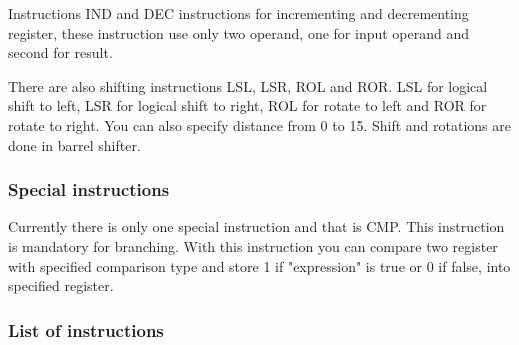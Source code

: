 Instructions IND and DEC instructions for incrementing and decrementing
register, these instruction use only two operand, one for input operand and
second for result.

There are also shifting instructions LSL, LSR, ROL and ROR. LSL for logical
shift to left, LSR for logical shift to right, ROL for rotate to left and ROR
for rotate to right. You can also specify distance from 0 to 15. Shift and
rotations are done in barrel shifter.

\subsubsection{Special instructions}

Currently there is only one special instruction and that is CMP. This
instruction is mandatory for branching. With this instruction you can compare
two register with specified comparison type and store 1 if "expression" is true
or 0 if false, into specified register.

\subsubsection{List of instructions}

